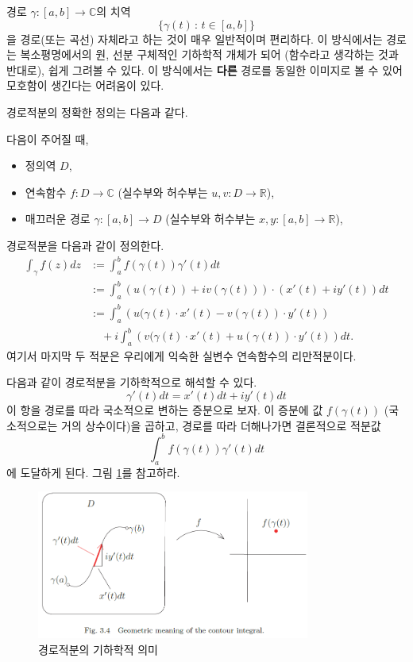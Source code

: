 \begin{salt_remark} \label{remark-3-1}
경로 $\gamma: [a,b]\to \mathbb C$의 치역
\[
\{\gamma(t) \,:\, t\in[a,b] \}
\]
을 경로(또는 곡선) 자체라고 하는 것이 매우 일반적이며 편리하다. 
이 방식에서는 경로는 
복소평명에서의 원, 선분 구체적인 기하학적 개체가 되어 (함수라고 생각하는 것과 반대로),
쉽게 그려볼 수 있다.
이 방식에서는 {\bf 다른} 경로를 동일한 이미지로 볼 수 있어
모호함이 생긴다는 어려움이 있다.
\end{salt_remark}

경로적분의 정확한 정의는 다음과 같다.

\begin{salt_definition} \label{def-3-1}
다음이 주어질 때,
\begin{itemize}
\item[(1)] 정의역 $D$,
\item[(2)] 연속함수  $f:D\to\mathbb C$ (실수부와 허수부는 
$u,v: D\to\mathbb R$),
\item[(3)] 매끄러운 경로 $\gamma : [a,b]\to D$
(실수부와 허수부는 $x,y: [a,b] \to \mathbb R$),
\end{itemize}
경로적분을 다음과 같이 정의한다.
\begin{align} \label{eq-3-2}
\int_\gamma f(z)dz
&:= \int_a^b f(\gamma(t))\gamma'(t)dt \\
&:= \int_a^b \left( u(\gamma(t)) + iv(\gamma(t)) \right) \cdot
(x'(t) + iy'(t))dt \nonumber \\
&:= \int_a^b \left( u(\gamma(t)\cdot x'(t) - v(\gamma(t))\cdot y'(t) \right) \nonumber \\
&\quad +i \int_a^b \left(v(\gamma(t)\cdot x'(t) + u(\gamma(t))\cdot y'(t) \right) dt \nonumber.
\end{align}
여기서 마지막 두 적분은 우리에게 익숙한 실변수 연속함수의 리만적분이다.
\end{salt_definition}

다음과 같이 경로적분을 기하학적으로 해석할 수 있다.
\[
\gamma'(t) dt = x'(t)dt + iy'(t)dt
\]
이 항을 경로를 따라 국소적으로 변하는 증분으로 보자.
이 증분에 값 $f(\gamma(t))$ (국소적으로는 거의 상수이다)을 곱하고,
경로를 따라 더해나가면 결론적으로 적분값
\[
\int_a^b f(\gamma(t))\gamma'(t)dt
\]
에 도달하게 된다. 그림 \ref{fig-3-4}를 참고하라.

\begin{figure}[!h]
\begin{center}
\includegraphics[width=0.8\textwidth]{./SaltChapter/fig-3-4}
\end{center}
\caption{경로적분의 기하학적 의미}
\label{fig-3-4}
\end{figure}

